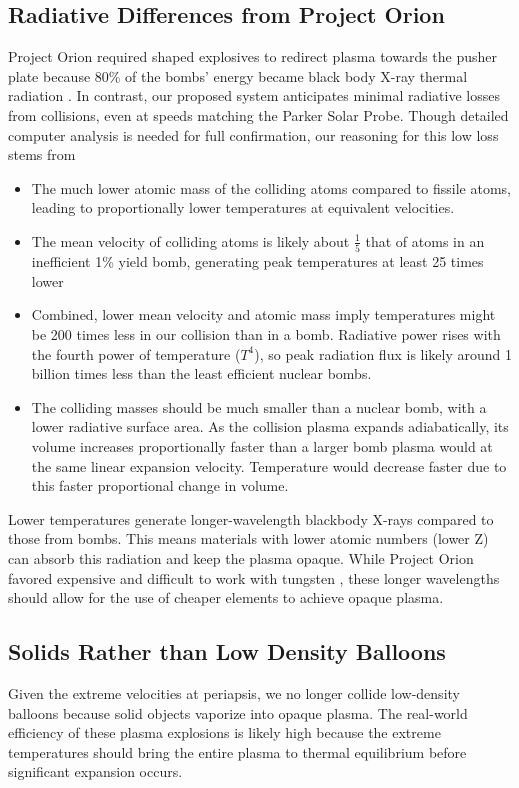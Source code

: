 \documentclass{article}
\begin{document}
{\subsection{Radiative Differences from Project Orion}
Project Orion required shaped explosives to redirect plasma towards the pusher plate because 80\% of the bombs' energy became black body X-ray thermal radiation \cite{toughsf_cassaba_howitzer}.  In contrast, our proposed system anticipates minimal radiative losses from collisions, even at speeds matching the Parker Solar Probe. Though detailed computer analysis is needed for full confirmation, our reasoning for this low loss stems from
\begin{itemize}
    \item The much lower atomic mass of the colliding atoms compared to fissile atoms, leading to proportionally lower temperatures at equivalent velocities.
    \item The mean velocity of colliding atoms is likely about $\frac{1}{5}$ that of atoms in an inefficient 1\% yield bomb, generating peak temperatures at least 25 times lower
    \item Combined, lower mean velocity and atomic mass imply temperatures might be 200 times less in our collision than in a bomb.  Radiative power rises with the fourth power of temperature ($T^4$), so peak radiation flux is likely around 1 billion times less than the least efficient nuclear bombs.
    \item The colliding masses should be much smaller than a nuclear bomb, with a lower radiative surface area.   As the collision plasma expands adiabatically, its volume increases proportionally faster than a larger bomb plasma would at the same linear expansion velocity.  Temperature would decrease faster due to this faster proportional change in volume. 
\end{itemize}

Lower temperatures generate longer-wavelength blackbody X-rays compared to those from bombs. This means materials with lower atomic numbers (lower Z) can absorb this radiation and keep the plasma opaque. While Project Orion favored expensive and difficult to work with tungsten \cite{toughsf_cassaba_howitzer}, these longer wavelengths should allow for the use of cheaper elements to achieve opaque plasma.

\subsection{Solids Rather than Low Density Balloons}\label{sec:solid_balloons}
Given the extreme velocities at periapsis, we no longer collide low-density balloons because solid objects vaporize into opaque plasma.   The real-world efficiency of these plasma explosions is likely high because the extreme temperatures should bring the entire plasma to thermal equilibrium before significant expansion occurs.

}
\end{document}
